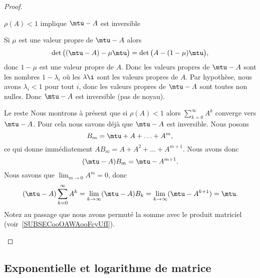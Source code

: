 \begin{proof}
\begin{subproof}
        \item[\( \rho(A)<1\) implique \( \mtu-A\) est inversible]

            Si \( \mu\) est une valeur propre de \( \mtu-A\) alors
            \begin{equation}
                \det\big( (\mtu-A)-\mu\mtu \big)=\det\big( A-(1-\mu)\mtu \big),
            \end{equation}
            donc \( 1-\mu\) est une valeur propre de \( A\). Donc les valeurs propres de \( \mtu-A\) sont les nombres \( 1-\lambda_i\) où les \( \lambda\i\) sont les valeurs propres de \( A\). Par hypothèse, nous avons \( \lambda_i<1\) pour tout \( i\), donc les valeurs propres de \( \mtu-A\) sont toutes non nulles. Donc \( \mtu-A\) est inversible (pas de noyau).

        \item[Le reste]
            Nous montrons à présent que si \( \rho(A)<1\) alors \( \sum_{k=0}^{\infty}A^k\) converge vers \(\mtu-A\). Pour cela nous savons déjà que \( \mtu-A\) est inversible. Nous posons
            \begin{equation}
                B_m=\mtu+A+\ldots +A^m,
            \end{equation}
            ce qui donne immédiatement \( AB_m=A+A^2+\ldots +A^{m+1}\). Nous avons donc
            \begin{equation}
                (\mtu-A)B_m=\mtu-A^{m+1}.
            \end{equation}
            Nous savons que \( \lim_{m\to0}A^m=0\), donc
            \begin{equation}
                (\mtu-A)\sum_{k=0}^{\infty}A^k=\lim_{k\to \infty} (\mtu-A)B_k=\lim_{k\to \infty} (\mtu-A^{k+1})=\mtu.
            \end{equation}
            Notez au passage que nous avons permuté la somme avec le produit matriciel (voir~\ref{SUBSECooOAWAooFcyUfI}).
    \end{subproof}
\end{proof}

\subsection{Exponentielle et logarithme de matrice}
\label{subsecXNcaQfZ}

